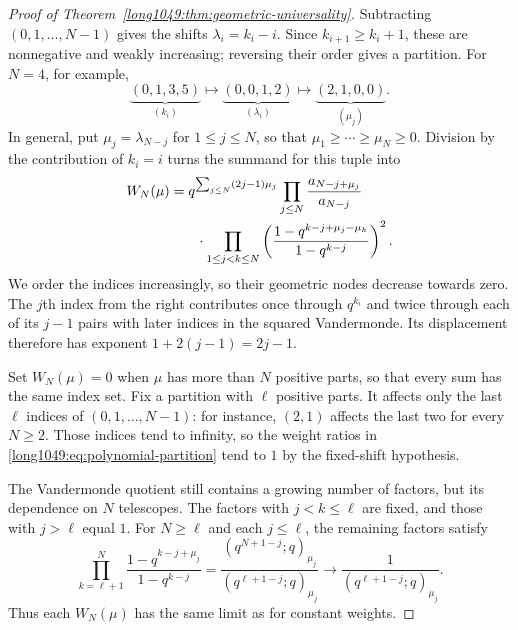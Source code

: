 \documentclass[11pt]{article}
\begin{document}
\begin{proof}[Proof of Theorem~\ref{long1049:thm:geometric-universality}]
Subtracting $(0,1,\ldots,N-1)$ gives the shifts $\lambda_i=k_i-i$.
Since $k_{i+1}\ge k_i+1$, these are nonnegative and weakly increasing;
reversing their order gives a partition. For $N=4$, for example,
\[
 \underbrace{(0,1,3,5)}_{(k_i)}
 \longmapsto\underbrace{(0,0,1,2)}_{(\lambda_i)}
 \longmapsto\underbrace{(2,1,0,0)}_{(\mu_j)}.
\]
In general, put $\mu_j=\lambda_{N-j}$ for $1\le j\le N$, so that
$\mu_1\ge\cdots\ge\mu_N\ge0$. Division by the contribution of
$k_i=i$ turns the summand for this tuple into
\begin{equation}\label{long1049:eq:polynomial-partition}
\begin{split}
 W_N(\mu)={}&q^{\sum_{j\le N}(2j-1)\mu_j}
 \prod_{j\le N}\frac{a_{N-j+\mu_j}}{a_{N-j}}\\
 &\hspace{2mm}\cdot\prod_{1\le j<k\le N}
 \left(\frac{1-q^{k-j+\mu_j-\mu_k}}{1-q^{k-j}}\right)^2.
\end{split}
\end{equation}
We order the indices increasingly, so their geometric nodes decrease
towards zero. The $j$th index from the right contributes once through
$q^{k_i}$ and twice through each of its $j-1$ pairs with later
indices in the squared Vandermonde. Its displacement therefore has exponent
$1+2(j-1)=2j-1$.

Set $W_N(\mu)=0$ when $\mu$ has more than $N$ positive parts,
so that every sum has the same index set. Fix a partition with
$\ell$ positive parts. It affects only the last $\ell$ indices
of $(0,1,\ldots,N-1)$: for instance, $(2,1)$ affects the last two
for every $N\ge2$. Those indices tend to infinity, so the weight
ratios in \eqref{long1049:eq:polynomial-partition} tend to $1$ by the fixed-shift hypothesis.

The Vandermonde quotient still contains a growing number of factors,
but its dependence on $N$ telescopes. The factors with $j<k\le\ell$
are fixed, and those with $j>\ell$ equal $1$. For $N\ge\ell$ and
each $j\le\ell$, the remaining factors satisfy
\begin{equation}\label{long1049:eq:partition-tail}
 \prod_{k=\ell+1}^{N}
 \frac{1-q^{k-j+\mu_j}}{1-q^{k-j}}
 =\frac{(q^{N+1-j};q)_{\mu_j}}{(q^{\ell+1-j};q)_{\mu_j}}
 \longrightarrow\frac1{(q^{\ell+1-j};q)_{\mu_j}}.
\end{equation}
Thus each $W_N(\mu)$ has the same limit as for constant weights.


\end{proof}
\end{document}

